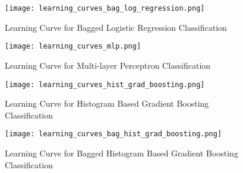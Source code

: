 \documentclass[11pt]{article}
\begin{document}
\begin{figure}[h]
\begin{center}
    \texttt{[image: learning\_curves\_bag\_log\_regression.png]}
\end{center}
\caption{Learning Curve for Bagged Logistic Regression Classification}
\label{fig:learning_curve_bag_log}
\end{figure}

\begin{figure}[h]
\begin{center}
    \texttt{[image: learning\_curves\_mlp.png]}
\end{center}
\caption{Learning Curve for Multi-layer Perceptron Classification}
\label{fig:learning_curve_mlp}
\end{figure}

\begin{figure}[h]
\begin{center}
    \texttt{[image: learning\_curves\_hist\_grad\_boosting.png]}
\end{center}
\caption{Learning Curve for Histogram Based Gradient Boosting Classification}
\label{fig:learning_curve_grad_boost}
\end{figure}

\begin{figure}[h]
\begin{center}
    \texttt{[image: learning\_curves\_bag\_hist\_grad\_boosting.png]}
\end{center}
\caption{Learning Curve for Bagged Histogram Based Gradient Boosting Classification}
\label{fig:learning_curve_bag_grad_boost}
\end{figure}

\clearpage


\end{document}
